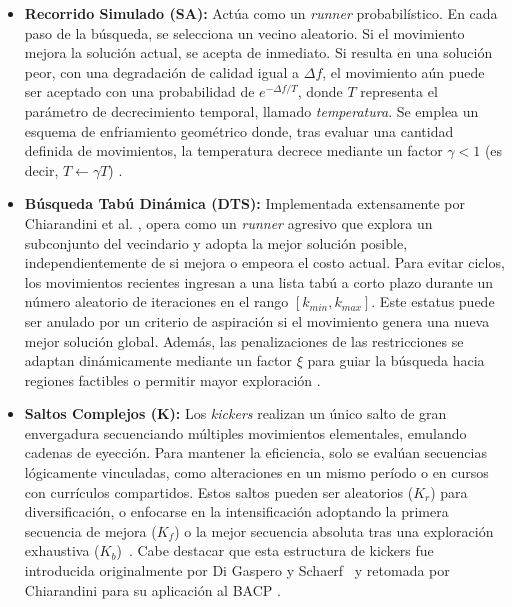 \documentclass[letter, 10pt]{article}
\begin{document}
\begin{itemize}
    \item \textbf{Recorrido Simulado (SA):} Act\'{u}a como un \textit{runner} probabil\'{i}stico. En cada paso de la b\'{u}squeda, se selecciona un vecino aleatorio. Si el movimiento mejora la soluci\'{o}n actual, se acepta de inmediato. Si resulta en una soluci\'{o}n peor, con una degradaci\'{o}n de calidad igual a $\Delta f$, el movimiento a\'{u}n puede ser aceptado con una probabilidad de $e^{-\Delta f / T}$, donde $T$ representa el par\'{a}metro de decrecimiento temporal, llamado \textit{temperatura}. Se emplea un esquema de enfriamiento geom\'{e}trico donde, tras evaluar una cantidad definida de movimientos, la temperatura decrece mediante un factor $\gamma < 1$ (es decir, $T \leftarrow \gamma T$) \cite{Chiarandini2012}.
    
    \item \textbf{B\'{u}squeda Tab\'{u} Din\'{a}mica (DTS):} Implementada extensamente por Chiarandini et al. \cite{Chiarandini2012}, opera como un \textit{runner} agresivo que explora un subconjunto del vecindario y adopta la mejor soluci\'{o}n posible, independientemente de si mejora o empeora el costo actual. Para evitar ciclos, los movimientos recientes ingresan a una lista tab\'{u} a corto plazo durante un n\'{u}mero aleatorio de iteraciones en el rango $[k_{min}, k_{max}]$. Este estatus puede ser anulado por un criterio de aspiraci\'{o}n si el movimiento genera una nueva mejor soluci\'{o}n global. Adem\'{a}s, las penalizaciones de las restricciones se adaptan din\'{a}micamente mediante un factor $\xi$ para guiar la b\'{u}squeda hacia regiones factibles o permitir mayor exploraci\'{o}n \cite{Chiarandini2012}.
    
    \item \textbf{Saltos Complejos (K):} Los \textit{kickers} realizan un \'{u}nico salto de gran envergadura secuenciando m\'{u}ltiples movimientos elementales, emulando cadenas de eyecci\'{o}n. Para mantener la eficiencia, solo se eval\'{u}an secuencias l\'{o}gicamente vinculadas, como alteraciones en un mismo per\'{i}odo o en cursos con curr\'{i}culos compartidos. Estos saltos pueden ser aleatorios ($K_r$) para diversificaci\'{o}n, o enfocarse en la intensificaci\'{o}n adoptando la primera secuencia de mejora ($K_f$) o la mejor secuencia absoluta tras una exploraci\'{o}n exhaustiva ($K_b$)~\cite{Chiarandini2012}. Cabe destacar que esta estructura de kickers fue introducida originalmente por Di Gaspero y Schaerf~\cite{digaspero2008} y retomada por Chiarandini para su aplicaci\'on al BACP \cite{Chiarandini2012}.


\end{itemize}
\end{document}
